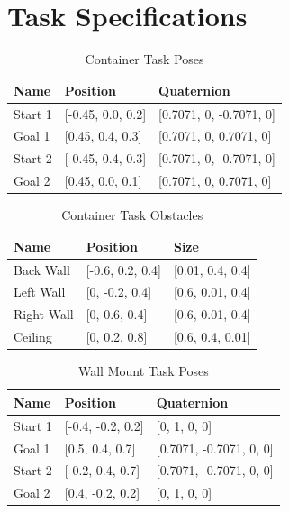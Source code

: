 \documentclass[defaultstyle,11pt]{thesis}
\begin{document}

\nocite{*}		
	


\appendix

\chapter{Task Specifications}

\begin{table}[H]
    \centering
    \caption{Container Task Poses}
    \label{tab:containerPoses}
    \begin{tabular}{lll}
    \hline
    \textbf{Name} & \textbf{Position} & \textbf{Quaternion} \\
    \hline
    Start 1 & [-0.45, 0.0, 0.2] & [0.7071, 0, -0.7071, 0] \\
    Goal 1 & [0.45, 0.4, 0.3] & [0.7071, 0, 0.7071, 0] \\
    Start 2 & [-0.45, 0.4, 0.3] & [0.7071, 0, -0.7071, 0] \\
    Goal 2 & [0.45, 0.0, 0.1] & [0.7071, 0, 0.7071, 0] \\
    \hline
    \end{tabular}
\end{table}

\begin{table}[H]
    \centering
    \caption{Container Task Obstacles}
    \label{tab:containerObstacles}
    \begin{tabular}{lll}
    \hline
    \textbf{Name} & \textbf{Position} & \textbf{Size} \\
    \hline
    Back Wall & [-0.6, 0.2, 0.4] & [0.01, 0.4, 0.4] \\
    Left Wall & [0, -0.2, 0.4] & [0.6, 0.01, 0.4] \\
    Right Wall & [0, 0.6, 0.4] & [0.6, 0.01, 0.4] \\
    Ceiling & [0, 0.2, 0.8] & [0.6, 0.4, 0.01] \\
    \hline
    \end{tabular}
\end{table}

\begin{table}[H]
    \centering
    \caption{Wall Mount Task Poses}
    \label{tab:wallMountPoses}
    \begin{tabular}{lll}
    \hline
    \textbf{Name} & \textbf{Position} & \textbf{Quaternion} \\
    \hline
    Start 1 & [-0.4, -0.2, 0.2] & [0, 1, 0, 0] \\
    Goal 1 & [0.5, 0.4, 0.7] & [0.7071, -0.7071, 0, 0] \\
    Start 2 & [-0.2, 0.4, 0.7] & [0.7071, -0.7071, 0, 0] \\
    Goal 2 & [0.4, -0.2, 0.2] & [0, 1, 0, 0] \\
    \hline
    \end{tabular}
\end{table}
\end{document}

